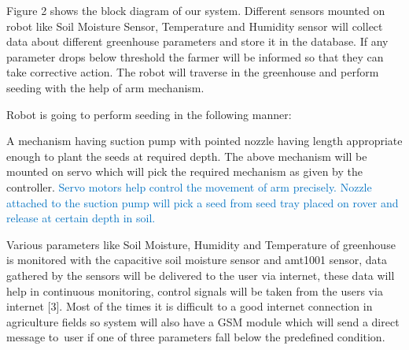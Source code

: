 \documentclass[12pt]{article}
\begin{document}
\vspace{\baselineskip}
\begin{adjustwidth}{0.5in}{0.52in}
\begin{justify}
Figure 2 shows the block diagram of our system. Different sensors mounted on robot like Soil Moisture Sensor, Temperature and Humidity sensor will collect data about different greenhouse parameters and store it in the database. If any parameter drops below threshold the farmer will be informed so that they can take corrective action. The robot will traverse in the greenhouse and perform seeding with the help of arm mechanism.
\end{justify}\par

\end{adjustwidth}

\begin{adjustwidth}{0.5in}{0.52in}
\begin{justify}
Robot is going to perform seeding in the following manner:
\end{justify}\par

\end{adjustwidth}

\begin{adjustwidth}{0.5in}{0.52in}
\begin{justify}
A mechanism having suction pump with pointed nozzle having length appropriate enough to plant the seeds at required depth. The above mechanism will be mounted on servo which will pick the required mechanism as given by the controller.\textcolor[HTML]{0070C0}{ Servo motors help control the movement of arm precisely. Nozzle attached to the suction pump will pick a seed from seed tray placed on rover and release at certain depth in soil.}
\end{justify}\par

\end{adjustwidth}

\begin{adjustwidth}{0.5in}{0.52in}
\begin{justify}
Various parameters like Soil Moisture, Humidity and Temperature of greenhouse is monitored with the capacitive soil moisture sensor and amt1001 sensor, data gathered by the sensors will be delivered to the user via internet, these data will help in continuous monitoring, control signals will be taken from the users via internet [3]. Most of the times it is difficult to a good internet connection in agriculture fields so system will also have a GSM module which will send a direct message to user if one of three parameters fall below the predefined condition.
\end{justify}\par

\end{adjustwidth}
\end{document}
